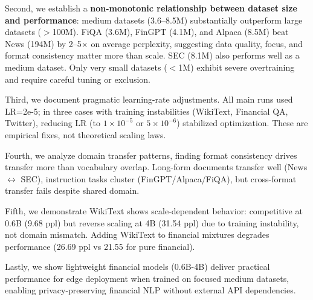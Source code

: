 Second, we establish a \textbf{non-monotonic relationship between dataset size and performance}: medium datasets (3.6–8.5M) substantially outperform large datasets ($>$100M). FiQA (3.6M), FinGPT (4.1M), and Alpaca (8.5M) beat News (194M) by 2–5$\times$ on average perplexity, suggesting data quality, focus, and format consistency matter more than scale. SEC (8.1M) also performs well as a medium dataset. Only very small datasets ($<$1M) exhibit severe overtraining and require careful tuning or exclusion.

Third, we document pragmatic learning-rate adjustments. All main runs used LR=2e-5; in three cases with training instabilities (WikiText, Financial QA, Twitter), reducing LR (to $1\times10^{-5}$ or $5\times10^{-6}$) stabilized optimization. These are empirical fixes, not theoretical scaling laws.

Fourth, we analyze domain transfer patterns, finding format consistency drives transfer more than vocabulary overlap. Long-form documents transfer well (News $\leftrightarrow$ SEC), instruction tasks cluster (FinGPT/Alpaca/FiQA), but cross-format transfer fails despite shared domain.

Fifth, we demonstrate WikiText shows scale-dependent behavior: competitive at 0.6B (9.68 ppl) but reverse scaling at 4B (31.54 ppl) due to training instability, not domain mismatch. Adding WikiText to financial mixtures degrades performance (26.69 ppl vs 21.55 for pure financial).

Lastly, we show lightweight financial models (0.6B-4B) deliver practical performance for edge deployment when trained on focused medium datasets, enabling privacy-preserving financial NLP without external API dependencies.
